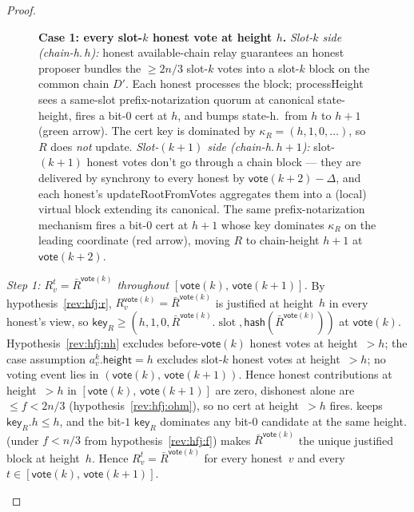 \documentclass{article}
\newcommand{\slot}[0]{\ensuremath{\operatorname{\mathrm{slot}}}}
\newcommand{\height}{\mathsf{height}}
\newcommand{\hash}{\mathsf{hash}}
\newcommand{\key}{\mathsf{key}}
\newcommand{\vote}{\mathsf{vote}}
\newcommand{\comm}[1]{\bar{#1}}
\newcommand{\processHeight}{\textsf{processHeight}\xspace}
\newcommand{\updateRootFromVotes}{\textsf{updateRootFromVotes}\xspace}
\theoremstyle{plain}
\theoremstyle{definition}
\theoremstyle{remark}
\newcommand{\HAR}{honest available-chain relay\xspace}
\begin{document}
\begin{proof}
\begin{description}
\begin{figure}[H]
\begin{tikzpicture}
\end{tikzpicture}
\caption{\label{rev:fig:hfj-case1}\textbf{Case 1: every slot-$k$ honest vote at height $h$.}
\emph{Slot-$k$ side (chain-h.\,$h$):} \HAR{} guarantees an honest proposer bundles the $\geq 2n/3$ slot-$k$ votes into a slot-$k$ block on the common chain $D'$. Each honest processes the block; \processHeight{} sees a same-slot prefix-notarization quorum at canonical state-height, fires a bit-$0$ cert at $h$, and bumps state-h.\ from $h$ to $h+1$ (green arrow). The cert key is dominated by $\kappa_R = (h, 1, 0, \ldots)$, so $R$ does \emph{not} update.
\emph{Slot-$(k+1)$ side (chain-h.\,$h+1$):} slot-$(k+1)$ honest votes don't go through a chain block — they are delivered by synchrony to every honest by $\vote(k+2) - \Delta$, and each honest's \updateRootFromVotes{} aggregates them into a (local) virtual block extending its canonical. The same prefix-notarization mechanism fires a bit-$0$ cert at $h+1$ whose key dominates $\kappa_R$ on the leading coordinate (red arrow), moving $R$ to chain-height $h+1$ at $\vote(k+2)$.}
\end{figure}

\emph{Step 1: $R_v^t = \comm{R}^{\vote(k)}$ throughout $[\vote(k),\, \vote(k+1)]$.}
By hypothesis~\ref{rev:hfj:r}, $R_v^{\vote(k)} = \comm{R}^{\vote(k)}$ is justified at height~$h$ in every honest's view, so $\key_R \geq (h, 1, 0, \comm{R}^{\vote(k)}.\slot, \hash(\comm{R}^{\vote(k)}))$ at $\vote(k)$. Hypothesis~\ref{rev:hfj:nh} excludes before-$\vote(k)$ honest votes at height~$>h$; the case assumption $a^k_v.\height = h$ excludes slot-$k$ honest votes at height~$>h$; no voting event lies in $(\vote(k),\, \vote(k+1))$. Hence honest contributions at height~$>h$ in $[\vote(k),\, \vote(k+1)]$ are zero, dishonest alone are $\leq f < 2n/3$ (hypothesis~\ref{rev:hfj:ohm}), so no cert at height~$>h$ fires.  keeps $\key_R.h \leq h$, and the bit-$1$ $\key_R$ dominates any bit-$0$ candidate at the same height.  (under $f < n/3$ from hypothesis~\ref{rev:hfj:f}) makes $\comm{R}^{\vote(k)}$ the unique justified block at height~$h$. Hence $R_v^t = \comm{R}^{\vote(k)}$ for every honest~$v$ and every $t \in [\vote(k),\, \vote(k+1)]$.


\end{description}
\end{proof}
\end{document}
